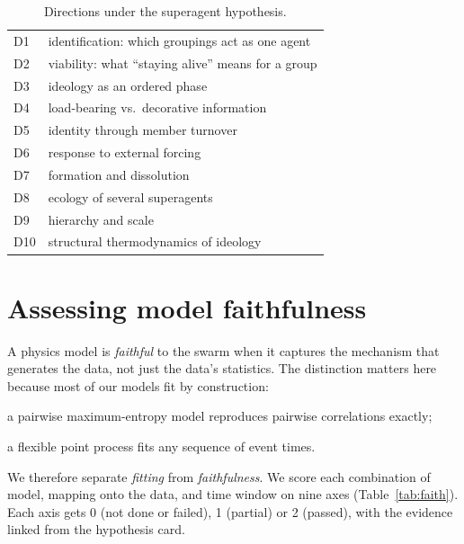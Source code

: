 \documentclass[reprint,aps,pre,10pt,superscriptaddress,nofootinbib]{revtex4-2}
\newenvironment{tight}{\begin{list}{\textbullet}{\setlength{\itemsep}{0pt}\setlength{\parsep}{0pt}\setlength{\topsep}{2pt}\setlength{\partopsep}{0pt}\setlength{\leftmargin}{1.1em}\setlength{\labelwidth}{0.6em}\setlength{\labelsep}{0.4em}}}{\end{list}}
\begin{document}
\begin{table}[t]
\caption{Directions under the superagent hypothesis.}
\label{tab:h01}
\scriptsize
\begin{tabular}{@{}l p{6.9cm}@{}}
\toprule
D1 & identification: which groupings act as one agent \\
D2 & viability: what ``staying alive'' means for a group \\
D3 & ideology as an ordered phase \\
D4 & load-bearing vs.\ decorative information \\
D5 & identity through member turnover \\
D6 & response to external forcing \\
D7 & formation and dissolution \\
D8 & ecology of several superagents \\
D9 & hierarchy and scale \\
D10 & structural thermodynamics of ideology \\
\bottomrule
\end{tabular}
\end{table}

\section{Assessing model faithfulness}\label{sec:faith}

A physics model is \emph{faithful} to the swarm when it captures the mechanism that generates the data, not just the data's statistics. The distinction matters here because most of our models fit by construction:
\begin{tight}
\item a pairwise maximum-entropy model reproduces pairwise correlations exactly;
\item a flexible point process fits any sequence of event times.
\end{tight}
We therefore separate \emph{fitting} from \emph{faithfulness}. We score each combination of model, mapping onto the data, and time window on nine axes (Table~\ref{tab:faith}). Each axis gets 0 (not done or failed), 1 (partial) or 2 (passed), with the evidence linked from the hypothesis card.
\end{document}
